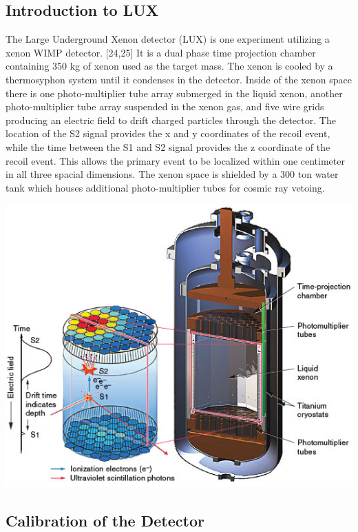 \documentclass[a4paper,12pt]{article}
\begin{document}
\subsection{Introduction to LUX}
The Large Underground Xenon detector (LUX) is one experiment utilizing a xenon WIMP detector. [24,25] It is a dual phase time projection chamber containing 350 kg of xenon used as the target mass.  The xenon is cooled by a thermosyphon system until it condenses in the detector.  Inside of the xenon space there is one photo-multiplier tube array submerged in the liquid xenon, another photo-multiplier tube array suspended in the xenon gas, and five wire grids producing an electric field to drift charged particles through the detector.  The location of the S2 signal provides the x and y coordinates of the recoil event, while the time between the S1 and S2 signal provides the z coordinate of the recoil event.  This allows the primary event to be localized within one centimeter in all three spacial dimensions.  The xenon space is shielded by a 300 ton water tank which houses additional photo-multiplier tubes for cosmic ray vetoing. 

\begin{center}
\includegraphics[scale=0.5]{lux.jpg}
\end{center}

\subsection{Calibration of the Detector}
\end{document}
